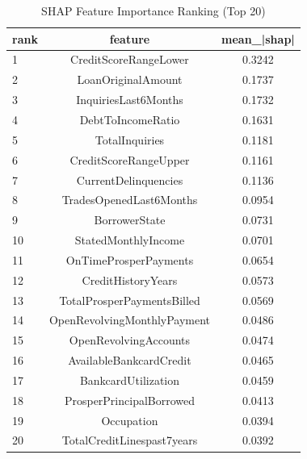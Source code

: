 \begin{table}
\centering
\caption{SHAP Feature Importance Ranking (Top 20)}
\label{tab:shap_ranking}
\begin{tabular}{lcc}
\toprule
rank & feature & mean_|shap| \\
\midrule
1 & CreditScoreRangeLower & 0.3242 \\
2 & LoanOriginalAmount & 0.1737 \\
3 & InquiriesLast6Months & 0.1732 \\
4 & DebtToIncomeRatio & 0.1631 \\
5 & TotalInquiries & 0.1181 \\
6 & CreditScoreRangeUpper & 0.1161 \\
7 & CurrentDelinquencies & 0.1136 \\
8 & TradesOpenedLast6Months & 0.0954 \\
9 & BorrowerState & 0.0731 \\
10 & StatedMonthlyIncome & 0.0701 \\
11 & OnTimeProsperPayments & 0.0654 \\
12 & CreditHistoryYears & 0.0573 \\
13 & TotalProsperPaymentsBilled & 0.0569 \\
14 & OpenRevolvingMonthlyPayment & 0.0486 \\
15 & OpenRevolvingAccounts & 0.0474 \\
16 & AvailableBankcardCredit & 0.0465 \\
17 & BankcardUtilization & 0.0459 \\
18 & ProsperPrincipalBorrowed & 0.0413 \\
19 & Occupation & 0.0394 \\
20 & TotalCreditLinespast7years & 0.0392 \\
\bottomrule
\end{tabular}
\end{table}
